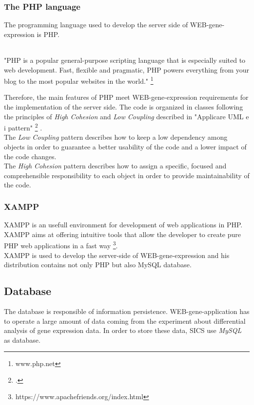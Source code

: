 \documentclass[a4paper]{report}
\begin{document}
\subsubsection{The PHP language}\label{php}

The programming language used to develop the server side of WEB-gene-expression is PHP. 

\\"PHP is a popular general-purpose scripting language that is especially suited to web development. Fast, flexible and pragmatic, PHP powers everything from your blog to the most popular websites in the world." \footnote{www.php.net}


Therefore, the main features of PHP meet WEB-gene-expression requirements for the implementation of the server side. The code is organized in classes following the principles of \emph{High Cohesion} and \emph{Low Coupling} described in "Applicare UML e i pattern" \footcite{Craig Larman, Luca Cabibbo} . \\
The \emph{Low Coupling} pattern describes how to keep a low dependency among objects in order to guarantee a better usability of the code and a lower impact of the code changes.\\
The \emph{High Cohesion} pattern describes how to assign a specific, focused and comprehensible responsibility to each object in order to provide maintainability of the code.\\

\subsubsection{XAMPP}

XAMPP is an usefull environment for development of web applications in PHP. XAMPP aims at offering intuitive tools that allow the developer to create pure PHP web applications in a fast way \footnote{https://www.apachefriends.org/index.html}.\\
XAMPP is used to develop the server-side of WEB-gene-expression and his distribution contains not only PHP but also MySQL database.

\subsection{Database}

The database is responsible of information persistence. WEB-gene-application has to operate a large amount of data coming from the experiment about differential analysis of gene expression data. In order to store these data, SICS use \emph{MySQL} as database.
\end{document}
